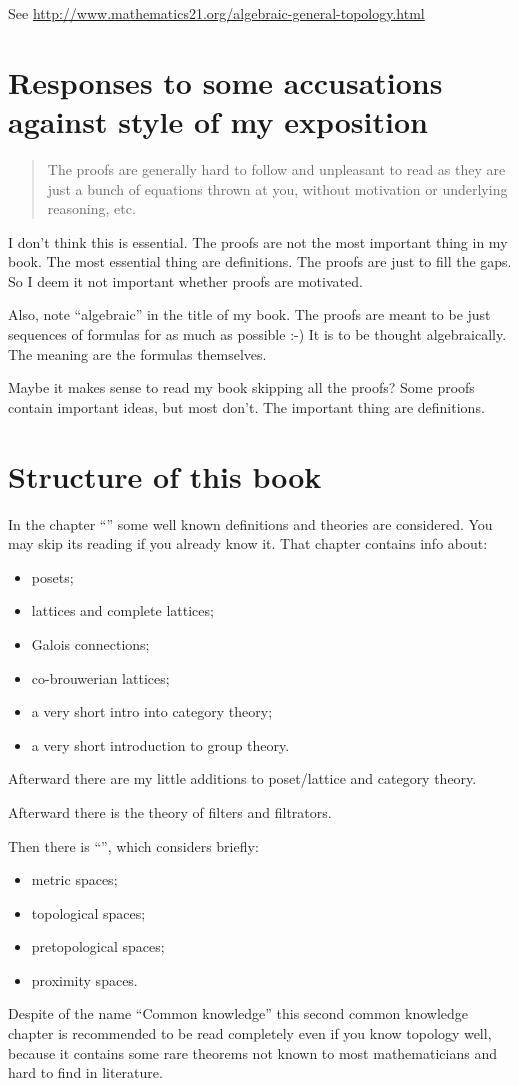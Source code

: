 See \url{http://www.mathematics21.org/algebraic-general-topology.html}

\section{Responses to some accusations against style of my exposition}

\begin{quote}
The proofs are generally hard to follow and unpleasant to read as they are just a bunch of equations thrown at you, without motivation or underlying reasoning, etc.
\end{quote}

I don't think this is essential. The proofs are not the most important thing in my book. The most essential thing are definitions. The proofs are just to fill the gaps. So I deem it not important whether proofs are motivated.

Also, note ``algebraic'' in the title of my book. The proofs are meant to be just sequences of formulas for as much as possible :-) It is to be thought algebraically. The meaning are the formulas themselves.

Maybe it makes sense to read my book skipping all the proofs? Some proofs contain important ideas, but most don't. The important thing are definitions.

\section{Structure of this book}

In the chapter ``'' some well known definitions
and theories are considered. You may skip its reading if you already
know it. That chapter contains info about:
\begin{itemize}
\item posets;
\item lattices and complete lattices;
\item Galois connections;
\item co-brouwerian lattices;
\item a very short intro into category theory;
\item a very short introduction to group theory.
\end{itemize}
Afterward there are my little additions to poset/lattice and category
theory.

Afterward there is the theory of filters and filtrators.

Then there is ``'', which considers briefly:
\begin{itemize}
\item metric spaces;
\item topological spaces;
\item pretopological spaces;
\item proximity spaces.
\end{itemize}
Despite of the name ``Common knowledge'' this second common knowledge
chapter is recommended to be read completely even if you know topology
well, because it contains some rare theorems not known to most mathematicians
and hard to find in literature.

